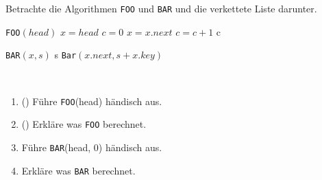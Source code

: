 \documentclass{uebung_cs}
\begin{document}
\begin{aufgabe}
	Betrachte die Algorithmen \texttt{FOO} und \texttt{BAR} und die verkettete Liste darunter.
	\begin{center}
	\begin{minipage}{0.45\textwidth}
		\begin{algorithmic}
			\STATE \texttt{FOO}$(head)$
			\STATE $x = head$
			\STATE $c = 0$
				\STATE $x = x.next$
				\STATE $c = c + 1$
			\ENDWHILE
			\RETURN c
		\end{algorithmic}
	\end{minipage}%
		\hfill
	\begin{minipage}{0.45\textwidth}
		\begin{algorithmic}
			\STATE \texttt{BAR}$(x,s)$
			\IF{$x == null$}
				\RETURN s
			\ELSE
				\RETURN \texttt{Bar}$(x.next, s + x.key)$
			\ENDIF
		\end{algorithmic}
	\end{minipage}\\%
	\end{center}
	
	\begin{center}
	\end{center}

	\begin{enumerate}
		\item (\warmup) Führe \texttt{FOO}(head) händisch aus.
		\item (\warmup) Erkläre was \texttt{FOO} berechnet.
		\item Führe \texttt{BAR}(head, 0) händisch aus.
		\item Erkläre was \texttt{BAR} berechnet.
	\end{enumerate}
\end{aufgabe}
\end{document}
